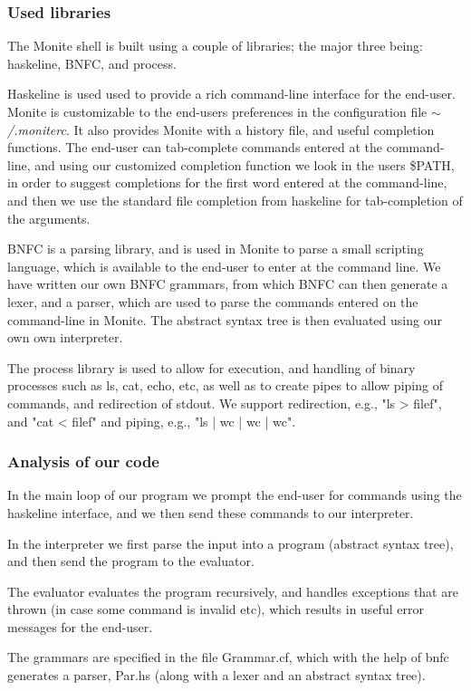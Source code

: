 \documentclass[11pt,a4paper]{article}
\begin{document}
\subsubsection{Used libraries}

The Monite shell is built using a couple of libraries; the major three being:
haskeline, BNFC, and process.

Haskeline is used used to provide a rich command-line interface for the
end-user. Monite is customizable to the end-users preferences in the
configuration file $\mathtt{\sim}$\textit{/.moniterc}. It also provides Monite
with a history file, and useful completion functions. The end-user can
tab-complete commands entered at the command-line, and using our customized
completion function we look in the users \$PATH, in order to suggest completions
for the first word entered at the command-line, and then we use the standard
file completion from haskeline for tab-completion of the arguments.

BNFC is a parsing library, and is used in Monite to parse a small scripting
language, which is available to the end-user to enter at the command line. We
have written our own BNFC grammars, from which BNFC can then generate a lexer,
and a parser, which are used to parse the commands entered on the command-line
in Monite. The abstract syntax tree is then evaluated using our own own
interpreter.

The process library is used to allow for execution, and handling of binary
processes such as ls, cat, echo, etc, as well as to create pipes to allow
piping of commands, and redirection of stdout. We support redirection, e.g.,
"ls > filef", and "cat < filef" and piping, e.g., "ls | wc | wc | wc".

\subsubsection{Analysis of our code}
In the main loop of our program we prompt the end-user for commands using the
haskeline interface, and we then send these commands to our interpreter.

In the interpreter we first parse the input into a program (abstract syntax
tree), and then send the program to the evaluator.

The evaluator evaluates the program recursively, and handles exceptions that are
thrown (in case some command is invalid etc), which results in useful error
messages for the end-user.

The grammars are specified in the file Grammar.cf, which with the help of bnfc
generates a parser, Par.hs (along with a lexer and an abstract syntax tree).
\end{document}
